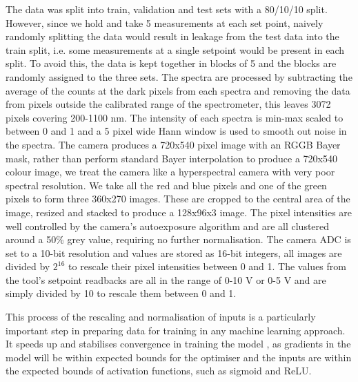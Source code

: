 \documentclass[10pt]{iopart}
\begin{document}
The data was split into train, validation and test sets with a 80/10/10 split. However, since we hold and take 5 measurements at each set point, naively randomly splitting the data would result in leakage from the test data into the train split, i.e. some measurements at a single setpoint would be present in each split. To avoid this, the data is kept together in blocks of 5 and the blocks are randomly assigned to the three sets. The spectra are processed by subtracting the average of the counts at the dark pixels from each spectra and removing the data from pixels outside the calibrated range of the spectrometer, this leaves 3072 pixels covering 200-1100 nm. The intensity of each spectra is min-max scaled to between 0 and 1 and a 5 pixel wide Hann window \cite{blackmanMeasurementPowerSpectra1958} is used to smooth out noise in the spectra. The camera produces a 720x540 pixel image with an RGGB Bayer mask, rather than perform standard Bayer interpolation to produce a 720x540 colour image, we treat the camera like a hyperspectral camera with very poor spectral resolution. We take all the red and blue pixels and one of the green pixels to form three 360x270 images. These are cropped to the central area of the image, resized and stacked to produce a 128x96x3 image. The pixel intensities are well controlled by the camera's autoexposure algorithm and are all clustered around a 50\% grey value, requiring no further normalisation. The camera ADC is set to a 10-bit resolution and values are stored as 16-bit integers, all images are divided by $2^{16}$ to rescale their pixel intensities between 0 and 1. The values from the tool's setpoint readbacks are all in the range of 0-10 V or 0-5 V and are simply divided by 10 to rescale them between 0 and 1.

This process of the rescaling and normalisation of inputs is a particularly important step in preparing data for training in any machine learning approach. It speeds up and stabilises convergence in training the model \cite{lecunEfficientBackProp1998, ioffeBatchNormalizationAccelerating2015}, as gradients in the model will be within expected bounds for the optimiser and the inputs are within the expected bounds of activation functions, such as sigmoid and ReLU.
\end{document}
